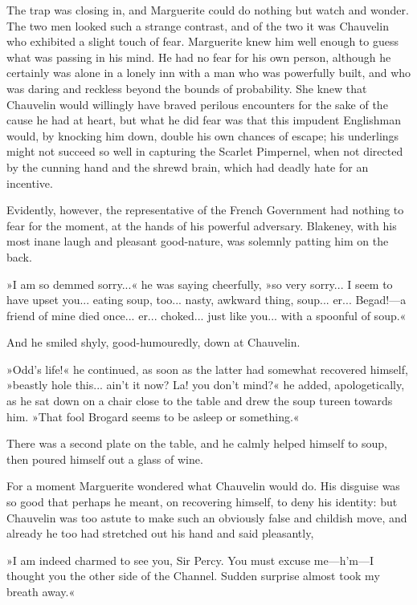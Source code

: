 The trap was closing in, and Marguerite could do nothing but watch and wonder. The two men looked such a strange contrast, and of the two it was Chauvelin who exhibited a slight touch of fear. Marguerite knew him well enough to guess what was passing in his mind. He had no fear for his own person, although he certainly was alone in a lonely inn with a man who was powerfully built, and who was daring and reckless beyond the bounds of probability. She knew that Chauvelin would willingly have braved perilous encounters for the sake of the cause he had at heart, but what he did fear was that this impudent Englishman would, by knocking him down, double his own chances of escape; his underlings might not succeed so well in capturing the Scarlet Pimpernel, when not directed by the cunning hand and the shrewd brain, which had deadly hate for an incentive.

Evidently, however, the representative of the French Government had nothing to fear for the moment, at the hands of his powerful adversary. Blakeney, with his most inane laugh and pleasant good-nature, was solemnly patting him on the back.

»I am so demmed sorry...« he was saying cheerfully, »so very sorry... I seem to have upset you... eating soup, too... nasty, awkward thing, soup... er... Begad!\allowbreak---\allowbreak a friend of mine died once... er... choked... just like you... with a spoonful of soup.«

And he smiled shyly, good-humouredly, down at Chauvelin.

»Odd's life!« he continued, as soon as the latter had somewhat recovered himself, »beastly hole this... ain't it now? La! you don't mind?« he added, apologetically, as he sat down on a chair close to the table and drew the soup tureen towards him. »That fool Brogard seems to be asleep or something.«

There was a second plate on the table, and he calmly helped himself to soup, then poured himself out a glass of wine.

For a moment Marguerite wondered what Chauvelin would do. His disguise was so good that perhaps he meant, on recovering himself, to deny his identity: but Chauvelin was too astute to make such an obviously false and childish move, and already he too had stretched out his hand and said pleasantly,\longdash


»I am indeed charmed to see you, Sir Percy. You must excuse me\allowbreak---\allowbreak h'm\allowbreak---\allowbreak I thought you the other side of the Channel. Sudden surprise almost took my breath away.«

